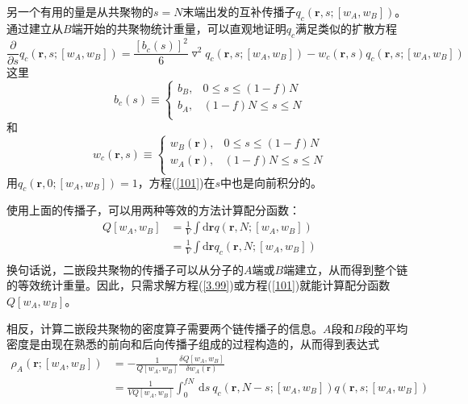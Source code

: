 另一个有用的量是从共聚物的$s=N$末端出发的互补传播子$q_c(\mathbf{r},s;[w_A,w_B])$。通过建立从$B$端开始的共聚物统计重量，可以直观地证明$q_c$满足类似的扩散方程
\begin{equation}
\frac{\partial}{\partial s}q_c(\mathbf{r},s;[w_A,w_B])=\frac{[b_c(s)]^2}{6}\triangledown ^2q_c(\mathbf{r},s;[w_A,w_B])-w_c(\mathbf{r},s)q_c(\mathbf{r},s;[w_A,w_B]) \label{101}
\end{equation}
这里
\begin{equation}
b_c (s)\equiv
\begin{cases}
b_B, & 0\leq s \leq (1-f)N \\
b_A, & (1-f)N \leq s \leq N\\
\end{cases}
\end{equation}
和
\begin{equation}
w_c (\mathbf{r},s)\equiv
\begin{cases}
w_B(\mathbf{r}), & 0\leq s \leq (1-f)N \\
w_A(\mathbf{r}), & (1-f)N \leq s \leq N\\
\end{cases}
\end{equation}
用$q_c(\mathbf{r},0;[w_A,w_B])=1$，方程(\ref{101})在$s$中也是向前积分的。		

使用上面的传播子，可以用两种等效的方法计算配分函数：
\begin{equation}
\begin{aligned}
Q[w_A,w_B] & = \frac{1}{V}\int \mathrm{d}\mathbf{r}q(\mathbf{r},N;[w_A,w_B]) \\
&=\frac{1}{V}\int \mathrm{d}\mathbf{r}q_c(\mathbf{r},N;[w_A,w_B]) \\
\end{aligned}	
\end{equation}
换句话说，二嵌段共聚物的传播子可以从分子的$A$端或$B$端建立，从而得到整个链的等效统计重量。因此，只需求解方程(\ref{3.99})或方程(\ref{101})就能计算配分函数$Q[w_A,w_B]$。

相反，计算二嵌段共聚物的密度算子需要两个链传播子的信息。$A$段和$B$段的平均密度是由现在熟悉的前向和后向传播子组成的过程构造的，从而得到表达式
\begin{equation}
\begin{aligned}
\rho _A(\mathbf{r};[w_A,w_B]) & =-\frac{1}{Q[w_A,w_B]}	\frac{\delta Q[w_A,w_B]}{\delta w_A(\mathbf{r})} \\
& =\frac{1}{VQ[w_A,w_B]} \int _{0}^{fN}\,\mathrm{d}s~q_c(\mathbf{r},N-s;[w_A,w_B])q(\mathbf{r},s;[w_A,w_B]) \\
\end{aligned}	
\end{equation}

